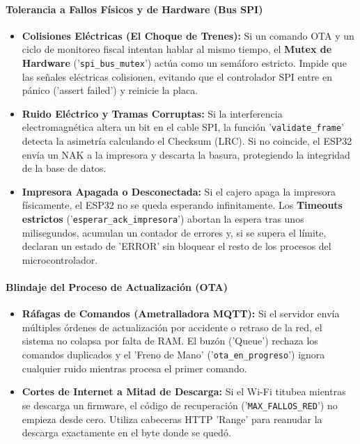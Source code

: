\documentclass[12pt, a4paper]{article}
\begin{document}
    \paragraph{Tolerancia a Fallos Físicos y de Hardware (Bus SPI)}

    \begin{itemize}
        \item \textbf{Colisiones Eléctricas (El Choque de Trenes):} Si un comando OTA y un ciclo de monitoreo fiscal intentan hablar al mismo tiempo, el \textbf{Mutex de Hardware} ('\texttt{spi\_bus\_mutex}') actúa como un semáforo estricto. Impide que las señales eléctricas colisionen, evitando que el controlador SPI entre en pánico ('assert failed') y reinicie la placa.
        
        \item \textbf{Ruido Eléctrico y Tramas Corruptas:} Si la interferencia electromagnética altera un bit en el cable SPI, la función '\texttt{validate\_frame}' detecta la asimetría calculando el Checksum (LRC). Si no coincide, el ESP32 envía un NAK a la impresora y descarta la basura, protegiendo la integridad de la base de datos.

        \item \textbf{Impresora Apagada o Desconectada:} Si el cajero apaga la impresora físicamente, el ESP32 no se queda esperando infinitamente. Los \textbf{Timeouts estrictos} ('\texttt{esperar\_ack\_impresora}') abortan la espera tras unos milisegundos, acumulan un contador de errores y, si se supera el límite, declaran un estado de 'ERROR' sin bloquear el resto de los procesos del microcontrolador.
    \end{itemize}

    \paragraph{Blindaje del Proceso de Actualización (OTA)}

    \begin{itemize}
        \item \textbf{Ráfagas de Comandos (Ametralladora MQTT):} Si el servidor envía múltiples órdenes de actualización por accidente o retraso de la red, el sistema no colapsa por falta de RAM. El buzón ('Queue') rechaza los comandos duplicados y el 'Freno de Mano' ('\texttt{ota\_en\_progreso}') ignora cualquier ruido mientras procesa el primer comando.
        \item \textbf{Cortes de Internet a Mitad de Descarga:} Si el Wi-Fi titubea mientras se descarga un firmware, el código de recuperación ('\texttt{MAX\_FALLOS\_RED}') no empieza desde cero. Utiliza cabeceras HTTP 'Range' para reanudar la descarga exactamente en el byte donde se quedó.
    \end{itemize}
\end{document}
